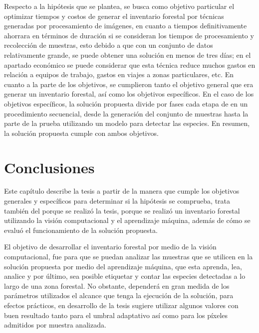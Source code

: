 Respecto a la hipótesis que se plantea, se busca como objetivo particular el optimizar tiempos y costos de generar el inventario forestal por técnicas generadas por procesamiento de imágenes, en cuanto a tiempos definitivamente ahorrara en términos de duración si se consideran los tiempos de procesamiento y recolección de muestras, esto debido a que con un conjunto de datos relativamente grande, se puede obtener una solución en menos de tres días; en el apartado económico se puede considerar que esta técnica reduce muchos gastos en relación a equipos de trabajo, gastos en viajes a zonas particulares, etc. En cuanto a la parte de los objetivos, se cumplieron tanto el objetivo general que era generar un inventario forestal, así como los objetivos específicos. En el caso de los objetivos específicos, la solución propuesta divide por fases cada etapa de en un procedimiento secuencial, desde la generación del conjunto de muestras hasta la parte de la prueba utilizando un modelo para detectar las especies. En resumen, la solución propuesta cumple con ambos objetivos.

\chapter{Conclusiones}
Este capítulo describe la tesis a partir de la manera que cumple los objetivos generales y específicos para determinar si la hipótesis se comprueba, trata también del porque se realizó la tesis, porque se realizó un inventario forestal utilizando la visión computacional y el aprendizaje máquina, además de cómo se evaluó el funcionamiento de la solución propuesta.

El objetivo de desarrollar el inventario forestal por medio de la visión computacional, fue para que se puedan analizar las muestras que se utilicen en la solución propuesta por medio del aprendizaje máquina, que esta aprenda, lea, analice y por último, sea posible etiquetar y contar las especies detectadas a lo largo de una zona forestal. No obstante, dependerá en gran medida de los parámetros utilizados el alcance que tenga la ejecución de la solución, para efectos prácticos, en desarrollo de la tesis sugiere utilizar algunos valores con buen resultado tanto para el umbral adaptativo así como para los píxeles admitidos por muestra analizada.

\clearpage

